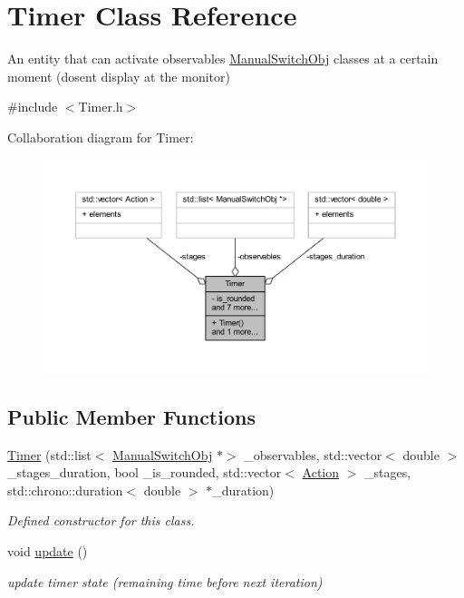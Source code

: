 \hypertarget{class_timer}{}\section{Timer Class Reference}
\label{class_timer}


An entity that can activate observables \hyperlink{class_manual_switch_obj}{Manual\+Switch\+Obj} classes at a certain moment (dosen\textquotesingle{}t display at the monitor)  




{\ttfamily \#include $<$Timer.\+h$>$}



Collaboration diagram for Timer\+:
\nopagebreak
\begin{figure}[H]
\begin{center}
\leavevmode
\includegraphics[width=350pt]{class_timer__coll__graph}
\end{center}
\end{figure}
\subsection*{Public Member Functions}
\begin{DoxyCompactItemize}
\item 
\hyperlink{class_timer_a18ad778fac9c2ccf488d4fa2e64b5d75}{Timer} (std\+::list$<$ \hyperlink{class_manual_switch_obj}{Manual\+Switch\+Obj} $\ast$$>$ \+\_\+observables, std\+::vector$<$ double $>$ \+\_\+stages\+\_\+duration, bool \+\_\+is\+\_\+rounded, std\+::vector$<$ \hyperlink{_manual_switch_obj_8h_a8bb1ef53467e4f61410d12822d922498}{Action} $>$ \+\_\+stages, std\+::chrono\+::duration$<$ double $>$ $\ast$\+\_\+duration)
\begin{DoxyCompactList}\small\item\em Defined constructor for this class. \end{DoxyCompactList}\item 
\mbox{\label{class_timer_a745ad59b5a46744cd871a1129a25d74f}} 
void \hyperlink{class_timer_a745ad59b5a46744cd871a1129a25d74f}{update} ()
\begin{DoxyCompactList}\small\item\em update timer state (remaining time before next iteration) \end{DoxyCompactList}\end{DoxyCompactItemize}
